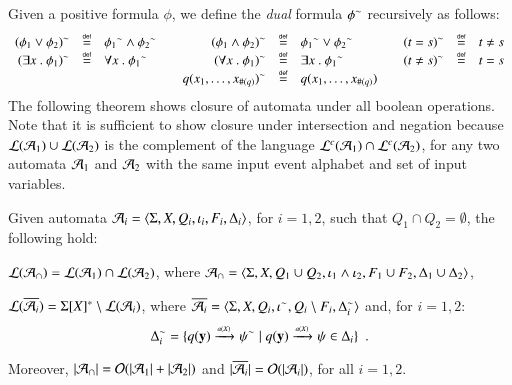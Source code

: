 Given a positive formula $\phi$, we define the \emph{dual} formula
${\phi}^{\sim}$ recursively as follows:
\[\begin{array}{rclcrclcrcl}
{(\phi_1 \vee \phi_2)}^{\sim} & \stackrel{\scriptscriptstyle{\mathsf{def}}}{=} & {\phi_1}^{\sim} \wedge {\phi_2}^{\sim} && 
{(\phi_1 \wedge \phi_2)}^{\sim} & \stackrel{\scriptscriptstyle{\mathsf{def}}}{=} & {\phi_1}^{\sim} \vee {\phi_2}^{\sim} &&
{(t = s)}^{\sim} & \stackrel{\scriptscriptstyle{\mathsf{def}}}{=} & t \neq s \\
{(\exists x ~.~ \phi_1)}^{\sim} & \stackrel{\scriptscriptstyle{\mathsf{def}}}{=} & \forall x ~.~ {\phi_1}^{\sim} && 
{(\forall x ~.~ \phi_1)}^{\sim} & \stackrel{\scriptscriptstyle{\mathsf{def}}}{=} & \exists x ~.~ {\phi_1}^{\sim} && 
{(t \neq s)}^{\sim} & \stackrel{\scriptscriptstyle{\mathsf{def}}}{=} & t = s \\
&&&& {q(x_1,\ldots,x_{\#(q)})}^{\sim} & \stackrel{\scriptscriptstyle{\mathsf{def}}}{=} & q(x_1,\ldots,x_{\#(q)})
\end{array}\]
The following theorem shows closure of automata under all boolean
operations. Note that it is sufficient to show closure under
intersection and negation because ${\mathcal L}({\mathcal{A}_1}) \cup {\mathcal L}({\mathcal{A}_2})$ is
the complement of the language ${\mathcal L}^c({\mathcal{A}_1}) \cap {\mathcal L}^c({\mathcal{A}_2})$, for
any two automata $\mathcal{A}_1$ and $\mathcal{A}_2$ with the same input event alphabet
and set of input variables.


\begin{theorem}\label{thm:closure}
  Given automata $\mathcal{A}_i = \langle \Sigma,X,Q_i,\iota_i,F_i,\Delta_i \rangle$,
  for $i=1,2$, such that $Q_1 \cap Q_2 = \emptyset$, the following hold: 
  \begin{compactenum}
    \item\label{it1:thm:closure} ${\mathcal L}({\mathcal{A}_\cap}) = {\mathcal L}({\mathcal{A}_1}) \cap {\mathcal L}({\mathcal{A}_2})$, where
      $\mathcal{A}_\cap = \langle \Sigma,X,Q_1 \cup Q_2, \iota_1 \wedge \iota_2,
      F_1 \cup F_2, \Delta_1 \cup \Delta_2 \rangle$, 
    \item\label{it2:thm:closure} ${\mathcal L}({\overline{\mathcal{A}_i}}) = \Sigma[X]^*
      \setminus {\mathcal L}({\mathcal{A}_i})$, where $\overline{\mathcal{A}_i} =
      \langle \Sigma,X,Q_i,{\iota}^{\sim},Q_i\setminus
        F_i,{\Delta}^{\sim}_i \rangle$ and, for $i=1,2$: \[{\Delta}^{\sim}_i =
      \{ q(\mathbf y) \xrightarrow{{\scriptscriptstyle a(X)}}_{{\scriptstyle }} {\psi}^{\sim} \mid
        q(\mathbf y) \xrightarrow{{\scriptscriptstyle a(X)}}_{{\scriptstyle }} \psi \in
        \Delta_i \}\enspace.\]
  \end{compactenum}
  Moreover, ${|{\mathcal{A}_\cap}|} = \mathcal{O}({{|{\mathcal{A}_1}|}+{|{\mathcal{A}_2}|}})$ and
  ${|{\overline{\mathcal{A}_i}}|} = \mathcal{O}({{|{\mathcal{A}_i}|}})$, for all $i=1,2$.
\end{theorem}
\ifLongVersion\else

